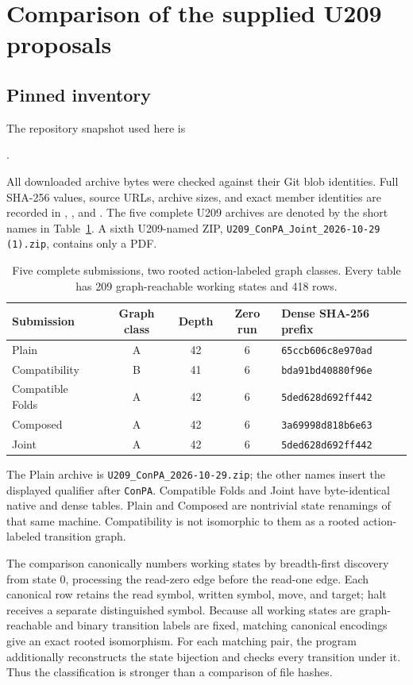 \documentclass[11pt,letterpaper]{article}
\newcommand{\code}[1]{\texttt{#1}}
\begin{document}
\section{Comparison of the supplied U209 proposals}\label{sec:comparison}
\subsection{Pinned inventory}
The repository snapshot used here is~\cite{inputs}
\begin{center}\small
{}.
\end{center}
All downloaded archive bytes were checked against their Git blob identities.
Full SHA-256 values, source URLs, archive sizes, and exact member identities
are recorded in ,
, and .
The five complete U209 archives are denoted by the short names in
Table~\ref{tab:comparison}. A sixth U209-named ZIP,
\code{U209\_ConPA\_Joint\_2026-10-29 (1).zip}, contains only a PDF.

\begin{table}[ht]
\centering\small
\begin{tabular}{@{}lcccl@{}}
\toprule
Submission & Graph class & Depth & Zero run & Dense SHA-256 prefix\\
\midrule
Plain & A & 42 & 6 & \code{65ccb606c8e970ad}\\
Compatibility & B & 41 & 6 & \code{bda91bd40880f96e}\\
Compatible Folds & A & 42 & 6 & \code{5ded628d692ff442}\\
Composed & A & 42 & 6 & \code{3a69998d818b6e63}\\
Joint & A & 42 & 6 & \code{5ded628d692ff442}\\
\bottomrule
\end{tabular}
\caption{Five complete submissions, two rooted action-labeled graph classes.
Every table has 209 graph-reachable working states and 418 rows.}
\label{tab:comparison}
\end{table}

The Plain archive is \code{U209\_ConPA\_2026-10-29.zip}; the other names
insert the displayed qualifier after \code{ConPA}. Compatible Folds and Joint
have byte-identical native and dense tables. Plain and Composed are
nontrivial state renamings of that same machine. Compatibility is not
isomorphic to them as a rooted action-labeled transition graph.

The comparison canonically numbers working states by breadth-first discovery
from state 0, processing the read-zero edge before the read-one edge.
Each canonical row retains the read symbol, written symbol, move, and target;
halt receives a separate distinguished symbol. Because all working states
are graph-reachable and binary transition labels are fixed, matching
canonical encodings give an exact rooted isomorphism. For each matching
pair, the program additionally reconstructs the state bijection and checks
every transition under it. Thus the classification is stronger than a
comparison of file hashes.
\end{document}
